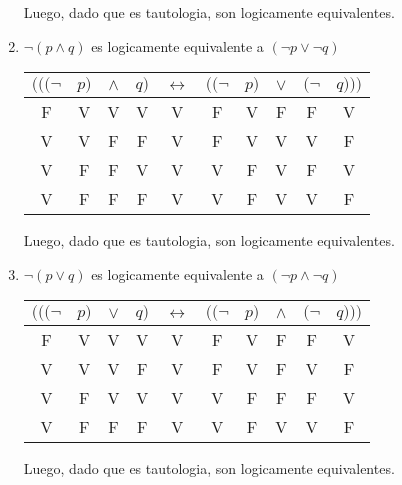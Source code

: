 \documentclass[osajnl,twocolumn,showpacs,superscriptaddress,10pt]{revtex4-1} %
\begin{document}
\begin{enumerate}[i-]
  Luego, dado que es tautologia, son logicamente equivalentes. \\
  
  \item $\neg (p \wedge q)$ es logicamente equivalente a $(\neg p \vee \neg q)$ \\
  
  \begin{table}[h!]
    \setlength{\tabcolsep}{1.0em}
    \centering
    \begin{tabular}{cccc|c|ccccc}
      $(((\neg$ & $p)$ & $\wedge$ & $q)$ & $\leftrightarrow$ & $((\neg$ & $p)$ & $\vee$ & $(\neg$ & $q)))$ \\
      \hline
      F & V & V & V & V & F & V & F & F & V \\
      V & V & F & F & V & F & V & V & V & F \\
      V & F & F & V & V & V & F & V & F & V \\
      V & F & F & F & V & V & F & V & V & F
    \end{tabular}
  \end{table}
  
  Luego, dado que es tautologia, son logicamente equivalentes. \\
  
  \item $\neg (p \vee q)$ es logicamente equivalente a $(\neg p \wedge \neg q)$ \\
  
  \begin{table}[h!]
    \setlength{\tabcolsep}{1.0em}
    \centering
    \begin{tabular}{cccc|c|ccccc}
      $(((\neg$ & $p)$ & $\vee$ & $q)$ & $\leftrightarrow$ & $((\neg$ & $p)$ & $\wedge$ & $(\neg$ & $q)))$ \\
      \hline
      F & V & V & V & V & F & V & F & F & V \\
      V & V & V & F & V & F & V & F & V & F \\
      V & F & V & V & V & V & F & F & F & V \\
      V & F & F & F & V & V & F & V & V & F
    \end{tabular}
  \end{table}
  
  Luego, dado que es tautologia, son logicamente equivalentes. \\
\end{enumerate}
\end{document}

